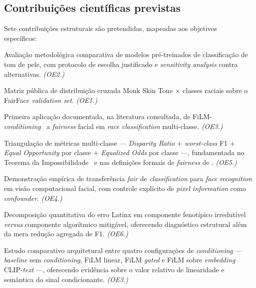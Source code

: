 \subsection{Contribuições científicas previstas}
\label{sec:contribuicoes}

Sete contribuições estruturais são pretendidas, mapeadas aos objetivos específicos:

\begin{description}[font=\bfseries\sffamily]
\item[C1.] Avaliação metodológica comparativa de modelos pré-treinados de classificação de tom de pele, com protocolo de escolha justificado e \emph{sensitivity analysis} contra alternativas. \textit{(OE2.)}
\item[C2.] Matriz pública de distribuição cruzada Monk Skin Tone $\times$ classes raciais sobre o FairFace \emph{validation set}. \textit{(OE1.)}
\item[C3.] Primeira aplicação documentada, na literatura consultada, de FiLM-\emph{conditioning}~\autocite{perez2018film} a \emph{fairness} facial em \emph{race classification} multi-classe. \textit{(OE3.)}
\item[C4.] Triangulação de métricas multi-classe --- \emph{Disparity Ratio} $+$ \emph{worst-class} F1 $+$ \emph{Equal Opportunity} por classe $+$ \emph{Equalized Odds} por classe ---, fundamentada no Teorema da Impossibilidade~\autocite{kleinberg2017inherent} e nas definições formais de \emph{fairness} de \textcite{hardt2016equality}. \textit{(OE5.)}
\item[C5.] Demonstração empírica de transferência \emph{fair} de \emph{classification} para \emph{face recognition} em visão computacional facial, com controle explícito de \emph{pixel information} como \emph{confounder}. \textit{(OE4.)}
\item[C6.] Decomposição quantitativa do erro Latinx em componente fenotípico irredutível \emph{versus} componente algorítmico mitigável, oferecendo diagnóstico estrutural além da mera redução agregada de F1. \textit{(OE6.)}
\item[C7.] Estudo comparativo arquitetural entre quatro configurações de \emph{conditioning} --- \emph{baseline} sem \emph{conditioning}, FiLM linear, FiLM \emph{gated} e FiLM sobre \emph{embedding} CLIP-\emph{text} ---, oferecendo evidência sobre o valor relativo de linearidade e semântica do sinal condicionante. \textit{(OE3.)}
\end{description}
